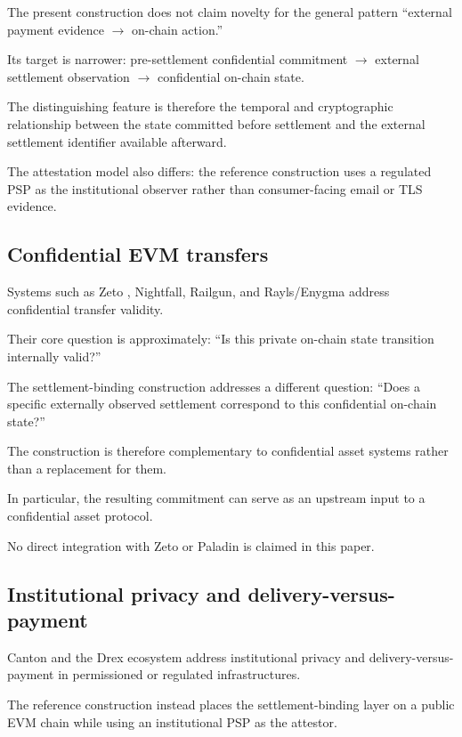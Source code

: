 \documentclass[10pt,twocolumn]{article}
\begin{document}
The present construction does not claim novelty for the general pattern
``external payment evidence $\rightarrow$ on-chain action.''

Its target is narrower: pre-settlement confidential commitment
$\rightarrow$ external settlement observation $\rightarrow$ confidential
on-chain state.

The distinguishing feature is therefore the temporal and cryptographic
relationship between the state committed before settlement and the
external settlement identifier available afterward.

The attestation model also differs: the reference construction uses a
regulated PSP as the institutional observer rather than consumer-facing
email or TLS evidence.

\subsection{Confidential EVM transfers}

Systems such as Zeto \cite{zeto}, Nightfall, Railgun, and Rayls/Enygma
\cite{rayls,rayls2} address confidential transfer validity.

Their core question is approximately: ``Is this private on-chain state
transition internally valid?''

The settlement-binding construction addresses a different question:
``Does a specific externally observed settlement correspond to this
confidential on-chain state?''

The construction is therefore complementary to confidential asset
systems rather than a replacement for them.

In particular, the resulting commitment can serve as an upstream input
to a confidential asset protocol.

No direct integration with Zeto or Paladin is claimed in this paper.

\subsection{Institutional privacy and delivery-versus-payment}

Canton \cite{canton} and the Drex ecosystem address institutional
privacy and delivery-versus-payment in permissioned or regulated
infrastructures.

The reference construction instead places the settlement-binding layer
on a public EVM chain while using an institutional PSP as the attestor.
\end{document}
